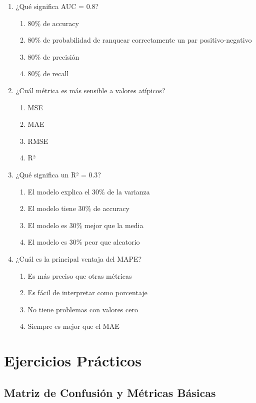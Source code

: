 \documentclass[12pt]{article}
\begin{document}
\begin{enumerate}
    \item ¿Qué significa AUC = 0.8?
    \begin{enumerate}
        \item 80\% de accuracy
        \item 80\% de probabilidad de ranquear correctamente un par positivo-negativo
        \item 80\% de precisión
        \item 80\% de recall
    \end{enumerate}
    
    \item ¿Cuál métrica es más sensible a valores atípicos?
    \begin{enumerate}
        \item MSE
        \item MAE
        \item RMSE
        \item R²
    \end{enumerate}
    
    \item ¿Qué significa un R² = 0.3?
    \begin{enumerate}
        \item El modelo explica el 30\% de la varianza
        \item El modelo tiene 30\% de accuracy
        \item El modelo es 30\% mejor que la media
        \item El modelo es 30\% peor que aleatorio
    \end{enumerate}
    
    \item ¿Cuál es la principal ventaja del MAPE?
    \begin{enumerate}
        \item Es más preciso que otras métricas
        \item Es fácil de interpretar como porcentaje
        \item No tiene problemas con valores cero
        \item Siempre es mejor que el MAE
    \end{enumerate}
\end{enumerate}

\section{Ejercicios Prácticos}

\subsection{Matriz de Confusión y Métricas Básicas}
\end{document}
